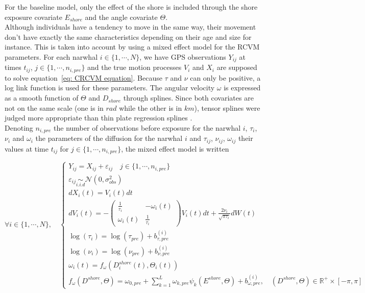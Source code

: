 \documentclass[11pt]{article}
\newcommand {\R}{\mathbb{R}}
\newcommand {\1}{\mathbb{1}}
\begin{document}
For the baseline model, only the effect of the shore is included through the shore exposure covariate $E_{shore}$ and the angle covariate $\Theta$.\\
Although individuals have a tendency to move in the same way, their movement don't have exactly the same characteristics depending on their age and size for instance. This is taken into account by using a mixed effect model for the RCVM parameters.
For each narwhal $i \in \{1, \cdots, N\}$, we have 	GPS observations $Y_{ij}$ at times $t_{ij}$, $j \in \{1,\cdots,n_{i,pre}\}$ and the true motion processes $V_i$ and $X_i$ are supposed to solve equation~\ref{eq: CRCVM equation}. Because $\tau$ and $\nu$ can only be positive, a log link function is used for these parameters. The angular velocity $\omega$ is expressed as a smooth function of $\Theta$ and $D_{shore}$ through splines. Since both covariates are not on the same scale (one is in $rad$ while the other is in $km$), tensor splines were judged more appropriate than thin plate regression splines \cite{wood_generalized_2017}.\\

Denoting $n_{i,pre}$ the number of observations before exposure for the narwhal $i$, $\tau_i$, $\nu_i$  and $\omega_i$ the parameters of the diffusion for the narwhal $i$ and  $\tau_{ij}$, $\nu_{ij}$, $\omega_{ij}$ their values at time $t_{ij}$ for $j \in \{1, \cdots,n_{i,pre}\}$,  the mixed effect model is written

\begin{equation}  \forall i \in \{1,\cdots,N\}, \quad \left\{
	\begin{array}{l}
		Y_{ij}=X_{ij}+\varepsilon_{ij} \quad j \in \{1,\cdots,n_{i,pre}\}\\
		\varepsilon_{ij} \underset{i.i.d}{\sim} \mathcal{N}(0,\sigma_{obs}^2)  \\
		dX_i(t)=V_i(t)dt  \\
		dV_i(t)=-\begin{pmatrix} 
			\frac{1}{\tau_i} & -\omega_i(t) \\
			\omega_i(t) & \frac{1}{\tau_i}
		\end{pmatrix}V_i(t)dt+\frac{2\nu_i}{\sqrt{\pi \tau_i}} dW(t) \\
		\log(\tau_i)=\log(\tau_{pre})+b_{\tau,pre}^{(i)} \\
	\log(\nu_i)=\log(\nu_{pre})+b_{\nu,pre}^{(i)}  \\
	\omega_i(t)=f_{\omega}(D^{shore}_i(t),\Theta_i(t))\\
	f_{\omega}(D^{shore},\Theta)=\omega_{0,pre}+\sum_{k=1}^{L} \omega_{k,pre} \psi_k(E^{shore},\Theta) + b_{\omega,pre}^{(i)}, \quad (D^{shore},\Theta) \in \R^+ \times [-\pi,\pi]
	\end{array}
	\right.
	\label{eq: exact statistical model}
\end{equation}
\end{document}
